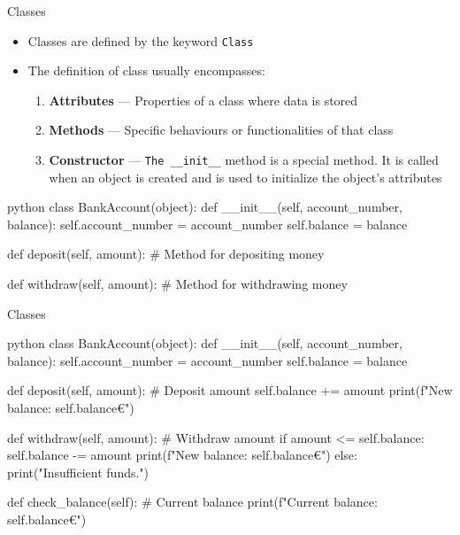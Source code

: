 \documentclass[
	11pt, 
]{beamer}
\begin{document}
\begin{frame}[fragile]{Classes}

\begin{itemize}
    \item Classes are defined by the keyword \texttt{Class}
    \item The definition of class usually encompasses:
    \begin{enumerate}
        \item \textbf{Attributes} --- Properties of a class where data is stored
        \item \textbf{Methods} --- Specific behaviours or functionalities of that class
        \item \textbf{Constructor} --- \texttt{The \_\_init\_\_} method is a special method. It is called when an object is created and is used to initialize the object's attributes
    \end{enumerate}
\end{itemize}

\begin{mintedbox}{python}
class BankAccount(object):
    def __init__(self, account_number, balance):
        self.account_number = account_number
        self.balance = balance
    
    def deposit(self, amount):
        # Method for depositing money
    
    def withdraw(self, amount):
        # Method for withdrawing money
\end{mintedbox}

\end{frame}


\begin{frame}[fragile]{Classes}
\tiny
\begin{mintedbox}{python}
class BankAccount(object):
    def __init__(self, account_number, balance):
        self.account_number = account_number
        self.balance = balance

    def deposit(self, amount): # Deposit amount 
        self.balance += amount
        print(f"New balance: {self.balance}€")

    def withdraw(self, amount): # Withdraw amount
        if amount <= self.balance:
            self.balance -= amount
            print(f"New balance: {self.balance}€")
        else:
            print("Insufficient funds.")

    def check_balance(self): # Current balance
        print(f"Current balance: {self.balance}€")
\end{mintedbox}
\end{frame}
\end{document}
